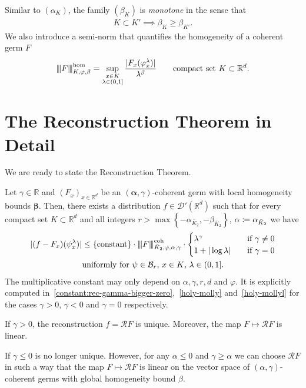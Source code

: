Similar to \((\alpha_K)\), the family \((\beta_K)\) is \emph{monotone} in the sense that 
\begin{align}\label{beta-monotone}
    K \subset K' \implies \beta_K \geq \beta_{K'}.
\end{align} 
We also introduce a semi-norm that quantifies the homogeneity of a coherent germ \( F  \)
\begin{align}\label{definition:semi-norm-homogeneity}
    {\left\vert\kern-0.25ex\left\vert\kern-0.25ex\left\vert F \right\vert\kern-0.25ex\right\vert\kern-0.25ex\right\vert}^{\mathrm{\hom}}_{K, \varphi, \beta} = \sup_{\substack{x \in K \\ \lambda \in (0,1]}} \frac{|F_x(\varphi^\lambda_x)|}{\lambda^\beta} \qquad \text{compact set \( K \subset \mathbb{R}^d \)}.
\end{align}

\section{The Reconstruction Theorem in Detail}

We are ready to state the Reconstruction Theorem.

\begin{theorem}\label{theorem:reconstruction-theorem}
   Let \(\gamma \in \mathbb{R}\) and \({(F_x)}_{x \in \mathbb{R}^d}\) be an \((\bm{\alpha}, \gamma)\)-coherent germ with local homogeneity bounds \(\bm \beta\). Then, there exists a distribution \(f \in \mathcal{D}'(\mathbb{R}^d)\) such that for every compact set \(K \subset \mathbb{R}^d\) and all integers \(r> \max \left\{ -\alpha_{\bar K_2}, -\beta_{\bar K_2} \right\}\), \( \alpha \coloneqq \alpha_{\bar{K}_{2}} \) we have
   \begin{gather}\label{reconstruction-theorem}
        |(f-F_x)(\psi^\lambda_x)| \leq \{\mathrm{constant} \} \cdot {\left\vert\kern-0.25ex\left\vert\kern-0.25ex\left\vert F \right\vert\kern-0.25ex\right\vert\kern-0.25ex\right\vert}^{\mathrm{coh}}_{\bar K_2, \varphi, \alpha, \gamma} \cdot \begin{cases}
            \lambda^\gamma \quad & \text{if \(\gamma \neq 0\)}\\
            1 + |\log \lambda| \quad & \text{if \(\gamma = 0\)}
        \end{cases}
        \\ \text{uniformly for \(\psi \in \mathcal{B}_r\), \(x \in K\), \(\lambda \in (0,1]\).} \nonumber
   \end{gather}
   The multiplicative constant may only depend on \( \alpha, \gamma, r, d \) and \( \varphi \). It is explicitly computed in~\eqref{constant:rec-gamma-bigger-zero},~\eqref{holy-molly} and~\eqref{holy-mollyl} for the cases \( \gamma > 0 \), \( \gamma < 0 \) and \( \gamma = 0 \) respectively.

   If \( \gamma > 0 \), the reconstruction \( f = \mathcal{R}F \) is unique. Moreover, the map \( F \mapsto \mathcal{R}F \) is linear.

   If \( \gamma \leq 0 \) is no longer unique. However, for any \( \alpha \leq 0 \) and \( \gamma \geq \alpha \) we can choose \( \mathcal{R}F \) in such a way that the map \( F \mapsto \mathcal{R}F \) is linear on the vector space of \( (\alpha, \gamma) \)-coherent germs with global homogeneity bound \( \beta \).
\end{theorem}

